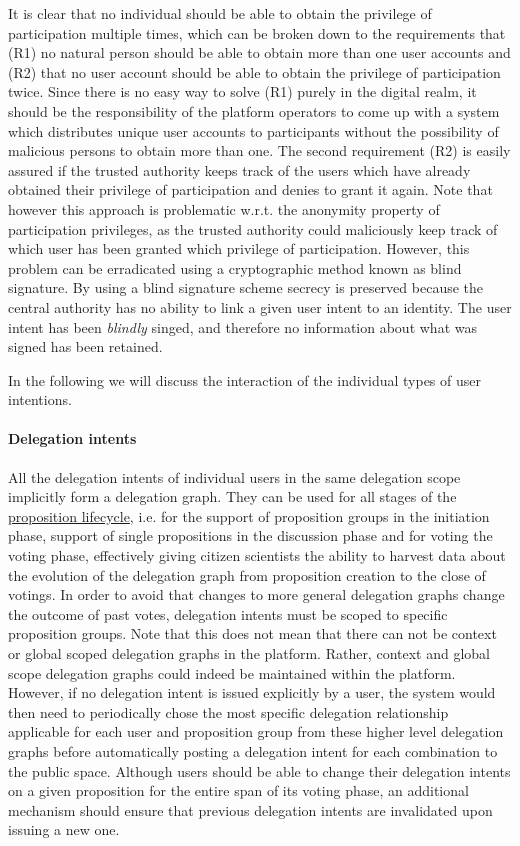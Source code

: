 It is clear that no individual should be able to obtain the privilege of participation multiple times, which can be broken down to the requirements that (R1) no natural person should be able to obtain more than one user accounts and (R2) that no user account should be able to obtain the privilege of participation twice.
Since there is no easy way to solve (R1) purely in the digital realm, it should be the responsibility of the platform operators to come up with a system which distributes unique user accounts to participants without the possibility of malicious persons to obtain more than one.
The second requirement (R2) is easily assured if the trusted authority keeps track of the users which have already obtained their privilege of participation and denies to grant it again.
Note that however this approach is problematic w.r.t. the anonymity property of participation privileges, as the trusted authority could maliciously keep track of which user has been granted which privilege of participation.
However, this problem can be erradicated using a cryptographic method known as blind signature.
By using a blind signature scheme secrecy is preserved because the central authority has no ability to link a given user intent to an identity.
The user intent has been \emph{blindly} singed, and therefore no information about what was signed has been retained. 

In the following we will discuss the interaction of the individual types of user intentions.

\paragraph{Delegation intents}
All the delegation intents of individual users in the same delegation scope implicitly form a delegation graph.
They can be used for all stages of the \hyperref[sec:Model_Propositions]{proposition lifecycle}, i.e. for the support of proposition groups in the initiation phase, support of single propositions in the discussion phase and for voting the voting phase, effectively giving citizen scientists the ability to harvest data about the evolution of the delegation graph from proposition creation to the close of votings.
In order to avoid that changes to more general delegation graphs change the outcome of past votes, delegation intents must be scoped to specific proposition groups.
Note that this does not mean that there can not be context or global scoped delegation graphs in the platform.
Rather, context and global scope delegation graphs could indeed be maintained within the platform.
However, if no delegation intent is issued explicitly by a user, the system would then need to periodically chose the most specific delegation relationship applicable for each user and proposition group from these higher level delegation graphs before automatically posting a delegation intent for each combination to the public space.
Although users should be able to change their delegation intents on a given proposition for the entire span of its voting phase, an additional mechanism should ensure that previous delegation intents are invalidated upon issuing a new one.

